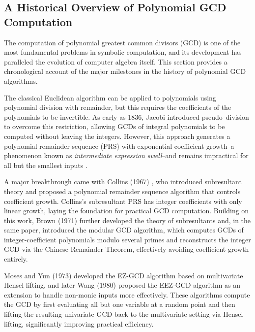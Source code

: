 \documentclass{article}
\numberwithin{equation}{section}
\begin{document}
\subsection{A Historical Overview of Polynomial GCD Computation}

The computation of polynomial greatest common divisors (GCD) is one of the most fundamental problems in symbolic computation, and its development has paralleled the evolution of computer algebra itself. This section provides a chronological account of the major milestones in the history of polynomial GCD algorithms.


The classical Euclidean algorithm can be applied to polynomials using polynomial division with remainder, but this requires the coefficients of the polynomials to be invertible. As early as 1836, Jacobi introduced pseudo--division to overcome this restriction, allowing GCDs of integral polynomials to be computed without leaving the integers. However, this approach generates a polynomial remainder sequence (PRS) with exponential coefficient growth--a phenomenon known as \emph{intermediate expression swell}--and remains impractical for all but the smallest inputs \cite{vonZurGathenLuck2003}.




A major breakthrough came with Collins (1967) \cite{collins1967}, who introduced subresultant theory and proposed a polynomial remainder sequence algorithm that controls coefficient growth. Collins's subresultant PRS has integer coefficients with only linear growth, laying the foundation for practical GCD computation. Building on this work, Brown (1971) \cite{brown1971} further developed the theory of subresultants and, in the same paper, introduced the modular GCD algorithm, which computes GCDs of integer-coefficient polynomials modulo several primes and reconstructs the integer GCD via the Chinese Remainder Theorem, effectively avoiding coefficient growth entirely.


 Moses and Yun (1973) \cite{moses1973} developed the EZ-GCD algorithm based on multivariate Hensel lifting, and later Wang (1980) \cite{wang1980} proposed the EEZ-GCD algorithm as an extension to handle non-monic inputs more effectively.
%
These algorithms compute the GCD by first evaluating all but one variable at a random point and then lifting the resulting univariate GCD back to the multivariate setting via Hensel lifting, significantly improving practical efficiency.
\end{document}
